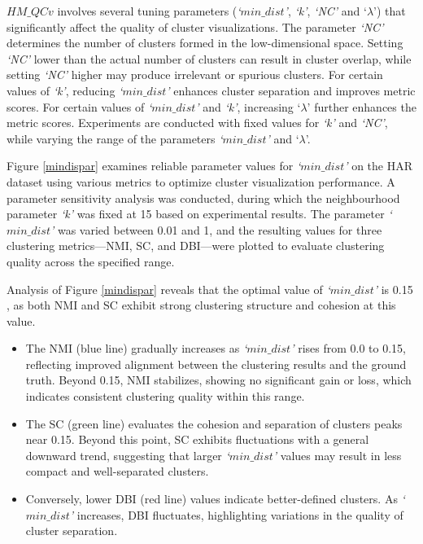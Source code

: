 $HM\_QCv$ involves several tuning parameters (\textit{`$min\_dist$'}, \textit{`k'}, \textit{`NC'} and `\textit{$\lambda$}') that significantly affect the quality of cluster visualizations. The parameter \textit{`NC'} determines the number of clusters formed in the low-dimensional space. Setting \textit{`NC'} lower than the actual number of clusters can result in cluster overlap, while setting \textit{`NC'} higher may produce irrelevant or spurious clusters. For certain values of \textit{`k'}, reducing \textit{`$min\_dist$'} enhances cluster separation and improves metric scores. For certain values of \textit{`$min\_dist$'} and \textit{`k'}, increasing `\textit{$\lambda$}' further enhances the metric scores. Experiments are conducted with fixed values for \textit{`k'} and \textit{`NC'}, while varying the range of the parameters \textit{`$min\_dist$'} and `\textit{$\lambda$}'.  




Figure \ref{mindispar} examines reliable parameter values for \textit{`$min\_dist$'} on the HAR dataset using various metrics to optimize cluster visualization performance. A parameter sensitivity analysis was conducted, during which the neighbourhood parameter \textit{`k'} was fixed at 15 based on experimental results. The parameter \textit{`$min\_dist$'} was varied between 0.01 and 1, and the resulting values for three clustering metrics—NMI, SC, and DBI—were plotted to evaluate clustering quality across the specified range.


Analysis of Figure \ref{mindispar} reveals that the optimal value of \textit{`$min\_dist$'} is 0.15 , as both 
NMI and SC exhibit strong clustering structure and cohesion at this value.
\begin{itemize}
    \item The NMI (blue line) gradually increases as \textit{`$min\_dist$'} rises from 0.0 to 0.15, reflecting improved alignment between the clustering results and the ground truth. Beyond 0.15, NMI stabilizes, showing no significant gain or loss, which indicates consistent clustering quality within this range.
    \item The SC (green line) evaluates the cohesion and separation of clusters peaks near 0.15. Beyond this point, SC exhibits fluctuations with a general downward trend, suggesting that larger \textit{`$min\_dist$'} values may result in less compact and well-separated clusters. 
    \item Conversely, lower DBI (red line) values indicate better-defined clusters. As \textit{`$min\_dist$'} increases, DBI fluctuates, highlighting variations in the quality of cluster separation.
\end{itemize}



